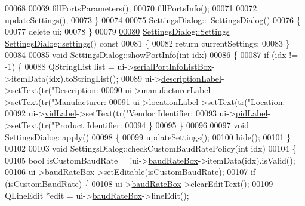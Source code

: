 \begin{DoxyCode}
00068 
00069     fillPortsParameters();
00070     fillPortsInfo();
00071 
00072     updateSettings();
00073 \}
00074 
\hypertarget{a00131_source_l00075}{}\hyperlink{a00075_ac48f54d4472902be0a3845a69167f068}{00075} \hyperlink{a00075_ac48f54d4472902be0a3845a69167f068}{SettingsDialog::~SettingsDialog}()
00076 \{
00077     \textcolor{keyword}{delete} ui;
00078 \}
00079 
\hypertarget{a00131_source_l00080}{}\hyperlink{a00075_afeb533d711d0392b9856c63b40b65ad7}{00080} \hyperlink{a00075_dc/d9a/a00218}{SettingsDialog::Settings} \hyperlink{a00075_afeb533d711d0392b9856c63b40b65ad7}{SettingsDialog::settings}()\textcolor{keyword}{ const}
00081 \textcolor{keyword}{}\{
00082     \textcolor{keywordflow}{return} currentSettings;
00083 \}
00084 
00085 \textcolor{keywordtype}{void} SettingsDialog::showPortInfo(\textcolor{keywordtype}{int} idx)
00086 \{
00087     \textcolor{keywordflow}{if} (idx != -1) \{
00088         QStringList list = ui->\hyperlink{a00082_a323eca0d6d4b94d2d41c7737fe8b2282}{serialPortInfoListBox}->itemData(idx).toStringList();
00089         ui->\hyperlink{a00082_aaf2756662f744e79aa3443f1e035870d}{descriptionLabel}->setText(tr(\textcolor{stringliteral}{"Description: %
00090         ui->\hyperlink{a00082_afeadc7657c9eaa3103bd529342f5fe97}{manufacturerLabel}->setText(tr(\textcolor{stringliteral}{"Manufacturer: %
00091         ui->\hyperlink{a00082_ad860892f11a79cb726643d3478078fcd}{locationLabel}->setText(tr(\textcolor{stringliteral}{"Location: %
00092         ui->\hyperlink{a00082_a50c8fdd36faae6146740e37728af71f2}{vidLabel}->setText(tr(\textcolor{stringliteral}{"Vendor Identifier: %
00093         ui->\hyperlink{a00082_a8ad53ddf3a11421d99dfa6fec8c92cfc}{pidLabel}->setText(tr(\textcolor{stringliteral}{"Product Identifier: %
00094     \}
00095 \}
00096 
00097 \textcolor{keywordtype}{void} SettingsDialog::apply()
00098 \{
00099     updateSettings();
00100     hide();
00101 \}
00102 
00103 \textcolor{keywordtype}{void} SettingsDialog::checkCustomBaudRatePolicy(\textcolor{keywordtype}{int} idx)
00104 \{
00105     \textcolor{keywordtype}{bool} isCustomBaudRate = !ui->\hyperlink{a00082_a766a61db4a8c72219543f7c096ae5601}{baudRateBox}->itemData(idx).isValid();
00106     ui->\hyperlink{a00082_a766a61db4a8c72219543f7c096ae5601}{baudRateBox}->setEditable(isCustomBaudRate);
00107     \textcolor{keywordflow}{if} (isCustomBaudRate) \{
00108         ui->\hyperlink{a00082_a766a61db4a8c72219543f7c096ae5601}{baudRateBox}->clearEditText();
00109         QLineEdit *edit = ui->\hyperlink{a00082_a766a61db4a8c72219543f7c096ae5601}{baudRateBox}->lineEdit();
}}}}}
\end{DoxyCode}
